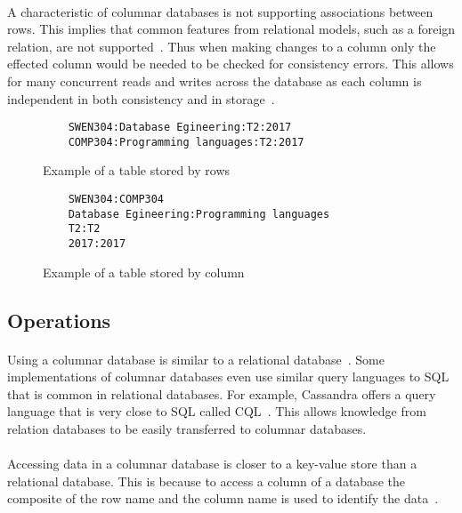 \documentclass{CRPITStyle}
\renewcommand{\cite}{\citep}
\begin{document}
\paragraph{}
A characteristic of columnar databases is not supporting associations between
rows.
This implies that common features from relational models, such as a foreign relation,
are not supported~\cite{relational_db,nosql_survey}.
Thus when making changes to a column only the effected column would be needed
to be checked for consistency errors.
This allows for many concurrent reads and writes across the database as each
column is independent in both consistency and in storage~\cite{nosql_survey}.


\begin{figure}
\begin{verbatim}
    SWEN304:Database Egineering:T2:2017
    COMP304:Programming languages:T2:2017
\end{verbatim}
\caption{Example of a table stored by rows}
\label{lst:row}
\end{figure}

\begin{figure}
\begin{verbatim}
    SWEN304:COMP304
    Database Egineering:Programming languages
    T2:T2
    2017:2017
\end{verbatim}
\caption{Example of a table stored by column}
\label{lst:column}
\end{figure}

\subsection{Operations}

\paragraph{}
Using a columnar database is similar to a relational database~\cite{usingcolumn}.
Some implementations of columnar databases even use similar query languages to
SQL that is common in relational databases.
For example, Cassandra offers a query language that is very close to
SQL called CQL~\cite{cassandra}.
This allows knowledge from relation databases to be easily transferred to
columnar databases.

\paragraph{}
Accessing data in a columnar database is closer to a key-value
store than a relational database.
This is because to access a column of a database the composite of
the row name and the column name is used to identify the
data~\cite{nosql_survey,usingcolumn}.
\end{document}

